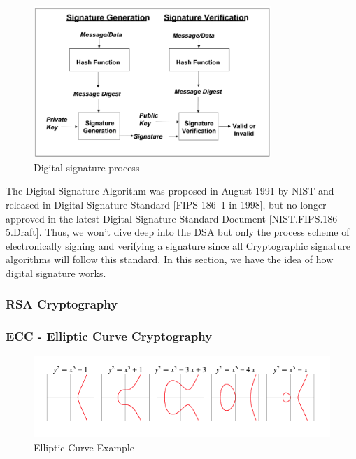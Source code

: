 \begin{figure}[ht!]
  \centering
  \includegraphics[width=0.8\textwidth]{images/digital_signature.png}
  \caption[Digital signature process]{Digital signature process}
  \label{fig:digital_signature}
\end{figure}

The Digital Signature Algorithm was proposed in August 1991 by NIST and released in Digital Signature Standard [FIPS 186–1 in 1998], but no longer approved in the latest Digital Signature Standard Document [NIST.FIPS.186-5.Draft].
Thus, we won't dive deep into the DSA but only the process scheme of electronically signing and verifying a signature since all Cryptographic signature algorithms will follow this standard.
In this section, we have the idea of how digital signature works.

\subsubsection{RSA Cryptography}

\subsubsection{ECC - Elliptic Curve Cryptography}
\begin{figure}[ht!]
  \centering
  \includegraphics[width=1\textwidth]{images/example_curve.png}
  \caption[Elliptic Curve Example]{Elliptic Curve Example}
  \label{fig:ec_example}
\end{figure}


